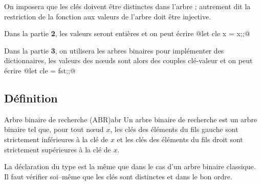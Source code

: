 On imposera que les clés doivent être distinctes dans l'arbre ; autrement dit la restriction de la fonction  aux valeurs de l'arbre doit être injective.

Dans la partie {\bf 2}, les valeurs seront entières et on peut écrire @let cle x = x;;@

Dans la partie {\bf 3}, on utilisera les arbres binaires pour implémenter des dictionnaires, les valeurs des nœuds sont alors des couples clé-valeur et on peut écrire @let cle = fst;;@
\subsection{Définition}
\begin{defin}{Arbre binaire de recherche (ABR)}{abr}
Un arbre binaire de recherche est un arbre binaire tel que,  pour tout nœud $x$,  les clés des éléments du fils gauche sont strictement inférieures à la clé de $x$ et les clés des éléments du fils droit sont strictement supérieures à la clé de $x$.
\end{defin}

\begin{figure*}[h]
\centering
{}
\caption{Exemple : arbre $a_0$}
\label{g:a0}
\end{figure*}

La déclaration du type est la même que dans le cas d'un arbre binaire classique. Il faut vérifier soi--même que les clés sont distinctes et dans le bon ordre.


